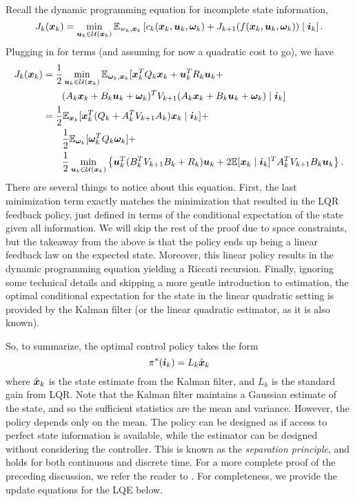 Recall the dynamic programming equation for incomplete state information, 
\begin{equation}
    J_k(\bm{x}_k) = \min_{\bm{u}_k \in \mathcal{U}(\bm{x}_k)} \mathbb{E}_{w_k, \bm{x}_k} \left[ c_k(\bm{x}_k,\bm{u}_k,\bm{\omega}_k) + J_{k+1}(f(\bm{x}_k,\bm{u}_k,\bm{\omega}_k)) \mid \bm{i}_k \right].
\end{equation}
Plugging in for terms (and assuming for now a quadratic cost to go), we have
\begin{align}
    J_k(\bm{x}_k) &= \frac{1}{2} \min_{\bm{u}_k \in \mathcal{U}(\bm{x}_k)} \mathbb{E}_{\bm{\omega}_k, \bm{x}_k} \large[ \bm{x}_k^T Q_k \bm{x}_k + \bm{u}_k^T R_k \bm{u}_k + \\
    &\qquad (A_{k} \bm{x}_{k} + B_{k} \bm{u}_{k} + \bm{\omega}_{k})^T V_{k+1} (A_{k} \bm{x}_{k} + B_{k} \bm{u}_{k} + \bm{\omega}_{k}) \mid \bm{i}_k \large]\nonumber\\
    &= \frac{1}{2} \mathbb{E}_{\bm{x}_k} \large[ \bm{x}_k^T (Q_k + A_k^T V_{k+1} A_k) \bm{x}_k \mid \bm{i}_k \large] + \\
    & \qquad \frac{1}{2} \mathbb{E}_{\bm{\omega}_k} \large[ \bm{\omega}_k^T Q_k \bm{\omega}_k] + \nonumber\\
    & \qquad \frac{1}{2} \min_{\bm{u}_k \in \mathcal{U}(\bm{x}_k)} \left\{ \bm{u}_k^T (B_k^T V_{k+1} B_k + R_k) \bm{u}_k + 2 \mathbb{E}[\bm{x}_k \mid \bm{i}_k]^T A_k^T V_{k+1} B_k \bm{u}_k \right\}.\nonumber
\end{align}
There are several things to notice about this equation. First, the last minimization term exactly matches the minimization that resulted in the LQR feedback policy, just defined in terms of the conditional expectation of the state given all information. We will skip the rest of the proof due to space constraints, but the takeaway from the above is that the policy ends up being a linear feedback law on the expected state. Moreover, this linear policy results in the dynamic programming equation yielding a Riccati recursion. Finally, ignoring some technical details and skipping a more gentle introduction to estimation, the optimal conditional expectation for the state in the linear quadratic setting is provided by the Kalman filter (or the linear quadratic estimator, as it is also known).

So, to summarize, the optimal control policy takes the form
\begin{equation}
    \pi^*(\bm{i}_k) = L_k \hat{\bm{x}}_k
\end{equation}
where $\hat{\bm{x}}_k$ is the state estimate from the Kalman filter, and $L_k$ is the standard gain from LQR. Note that the Kalman filter maintains a Gaussian estimate of the state, and so the sufficient statistics are the mean and variance. However, the policy depends only on the mean. The policy can be designed as if access to perfect state information is available, while the estimator can be designed without considering the controller. This is known as the \textit{separation principle}, and holds for both continuous and discrete time. For a more complete proof of the preceding discussion, we refer the reader to \cite{bertsekas1995dynamic}. For completeness, we provide the update equations for the LQE below.

